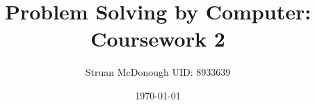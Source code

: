 \documentclass[12pt]{article}
\begin{document}
\title{Problem Solving by Computer: Coursework 2}      %
\author{Struan McDonough UID: 8933639}      %
\date{\today} %
\maketitle
\end{document}
